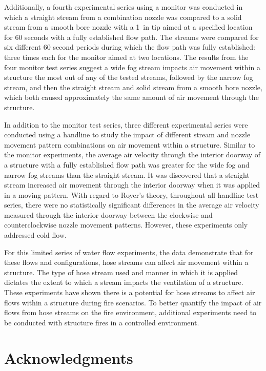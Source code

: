 \documentclass[12pt,oneside]{book}
\begin{document}
Additionally, a fourth experimental series using a monitor was conducted in which a straight stream from a combination nozzle was compared to a solid stream from a smooth bore nozzle with a 1~in tip aimed at a specified location for 60 seconds with a fully established flow path. The streams were compared for six different 60 second periods during which the flow path was fully established: three times each for the monitor aimed at two locations. The results from the four monitor test series suggest a wide fog stream impacts air movement within a structure the most out of any of the tested streams, followed by the narrow fog stream, and then the straight stream and solid stream from a smooth bore nozzle, which both caused approximately the same amount of air movement through the structure.

In addition to the monitor test series, three different experimental series were conducted using a handline to study the impact of different stream and nozzle movement pattern combinations on air movement within a structure. Similar to the monitor experiments, the average air velocity through the interior doorway of a structure with a fully established flow path was greater for the wide fog and narrow fog streams than the straight stream. It was discovered that a straight stream increased air movement through the interior doorway when it was applied in a moving pattern. With regard to Royer's theory, throughout all handline test series, there were no statistically significant differences in the average air velocity measured through the interior doorway between the clockwise and counterclockwise nozzle movement patterns. However, these experiments only addressed cold flow.

For this limited series of water flow experiments, the data demonstrate that for these flows and configurations, hose streams can affect air movement within a structure. The type of hose stream used and manner in which it is applied dictates the extent to which a stream impacts the ventilation of a structure. These experiments have shown there is a potential for hose streams to affect air flows within a structure during fire scenarios. To better quantify the impact of air flows from hose streams on the fire environment, additional experiments need to be conducted with structure fires in a controlled environment.

\chapter{Acknowledgments}
\label{chap:acknowledgments}
\end{document}
